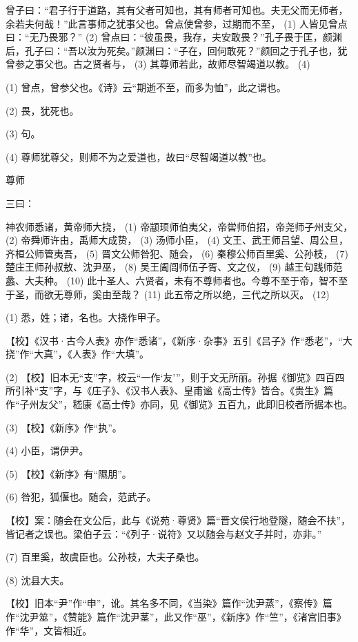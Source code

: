 \documentclass[12pt,UTF8]{ctexbook}
\begin{document}
曾子曰：“君子行于道路，其有父者可知也，其有师者可知也。夫无父而无师者，余若夫何哉！”此言事师之犹事父也。曾点使曾参，过期而不至， (1) 人皆见曾点曰：“无乃畏邪？” (2) 曾点曰：“彼虽畏，我存，夫安敢畏？”孔子畏于匡，颜渊后，孔子曰：“吾以汝为死矣。”颜渊曰：“子在，回何敢死？”颜回之于孔子也，犹曾参之事父也。古之贤者与， (3) 其尊师若此，故师尽智竭道以教。 (4)

(1) 曾点，曾参父也。《诗》云“期逝不至，而多为恤”，此之谓也。

(2) 畏，犹死也。

(3) 句。

(4) 尊师犹尊父，则师不为之爱道也，故曰“尽智竭道以教”也。





尊师


三曰：

神农师悉诸，黄帝师大挠， (1) 帝颛顼师伯夷父，帝喾师伯招，帝尧师子州支父， (2) 帝舜师许由，禹师大成贽， (3) 汤师小臣， (4) 文王、武王师吕望、周公旦，齐桓公师管夷吾， (5) 晋文公师咎犯、随会， (6) 秦穆公师百里奚、公孙枝， (7) 楚庄王师孙叔敖、沈尹巫， (8) 吴王阖闾师伍子胥、文之仪， (9) 越王句践师范蠡、大夫种。 (10) 此十圣人、六贤者，未有不尊师者也。今尊不至于帝，智不至于圣，而欲无尊师，奚由至哉？ (11) 此五帝之所以绝，三代之所以灭。 (12)

(1) 悉，姓；诸，名也。大挠作甲子。

【校】《汉书·古今人表》亦作“悉诸”，《新序·杂事》五引《吕子》作“悉老”，“大挠”作“大真”，《人表》作“大填”。

(2) 【校】旧本无“支”字，校云“一作‘友’”，则于文无所丽。孙据《御览》四百四所引补“支”字，与《庄子》、《汉书人表》、皇甫谧《高士传》皆合。《贵生》篇作“子州友父”，嵇康《高士传》亦同，见《御览》五百九，此即旧校者所据本也。

(3) 【校】《新序》作“执”。

(4) 小臣，谓伊尹。

(5) 【校】《新序》有“隰朋”。

(6) 咎犯，狐偃也。随会，范武子。

【校】案：随会在文公后，此与《说苑·尊贤》篇“晋文侯行地登隧，随会不扶”，皆记者之误也。梁伯子云：“《列子·说符》又以随会与赵文子并时，亦非。”

(7) 百里奚，故虞臣也。公孙枝，大夫子桑也。

(8) 沈县大夫。

【校】旧本“尹”作“申”，讹。其名多不同，《当染》篇作“沈尹蒸”，《察传》篇作“沈尹筮”，《赞能》篇作“沈尹茎”，此又作“巫”，《新序》作“竺”，《渚宫旧事》作“华”，文皆相近。
\end{document}
